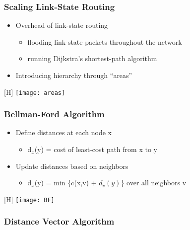 \documentclass[../resumosRCOM.tex]{subfiles}
\begin{document}
\subsubsection{Scaling Link-State Routing}

\begin{itemize}
    \item Overhead of link-state routing
    \begin{itemize}
        \item flooding link-state packets throughout the network
        \item running Dijkstra’s shortest-path algorithm
    \end{itemize}
    \item Introducing hierarchy through “areas”
\end{itemize}

\begin{center}[H]
    \texttt{[image: areas]}
\end{center}

\subsubsection{Bellman-Ford Algorithm}

\begin{itemize}
    \item Define distances at each node x
    \begin{itemize}
        \item d$_x$(y) = cost of least-cost path from x to y
    \end{itemize}
    \item Update distances based on neighbors
    \begin{itemize}
        \item d$_x$(y) = min \{c(x,v) + $d_v(y)$\} over all neighbors v
    \end{itemize}
\end{itemize}

\begin{center}[H]
    \texttt{[image: BF]}
\end{center}

\subsubsection{Distance Vector Algorithm}
\end{document}
